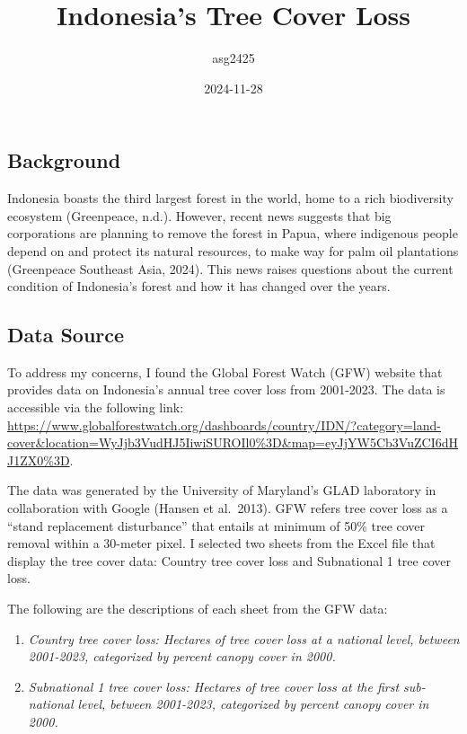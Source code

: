\documentclass[
]{article}
\title{Indonesia's Tree Cover Loss}
\author{asg2425}
\date{2024-11-28}
\providecommand{\tightlist}{%
  \setlength{\itemsep}{0pt}\setlength{\parskip}{0pt}}
\begin{document}
\maketitle

\subsection{Background}\label{background}

Indonesia boasts the third largest forest in the world, home to a rich
biodiversity ecosystem (Greenpeace, n.d.). However, recent news suggests
that big corporations are planning to remove the forest in Papua, where
indigenous people depend on and protect its natural resources, to make
way for palm oil plantations (Greenpeace Southeast Asia, 2024). This
news raises questions about the current condition of Indonesia's forest
and how it has changed over the years.

\subsection{Data Source}\label{data-source}

To address my concerns, I found the Global Forest Watch (GFW) website
that provides data on Indonesia's annual tree cover loss from 2001-2023.
The data is accessible via the following link:
\url{https://www.globalforestwatch.org/dashboards/country/IDN/?category=land-cover&location=WyJjb3VudHJ5IiwiSUROIl0\%3D&map=eyJjYW5Cb3VuZCI6dHJ1ZX0\%3D}.

The data was generated by the University of Maryland's GLAD laboratory
in collaboration with Google (Hansen et al.~2013). GFW refers tree cover
loss as a ``stand replacement disturbance'' that entails at minimum of
50\% tree cover removal within a 30-meter pixel. I selected two sheets
from the Excel file that display the tree cover data: Country tree cover
loss and Subnational 1 tree cover loss.

The following are the descriptions of each sheet from the GFW data:

\begin{enumerate}
\def\labelenumi{\arabic{enumi}.}
\tightlist
\item
  \emph{Country tree cover loss: Hectares of tree cover loss at a
  national level, between 2001-2023, categorized by percent canopy cover
  in 2000.}
\item
  \emph{Subnational 1 tree cover loss: Hectares of tree cover loss at
  the first sub-national level, between 2001-2023, categorized by
  percent canopy cover in 2000.}
\end{enumerate}
\end{document}

